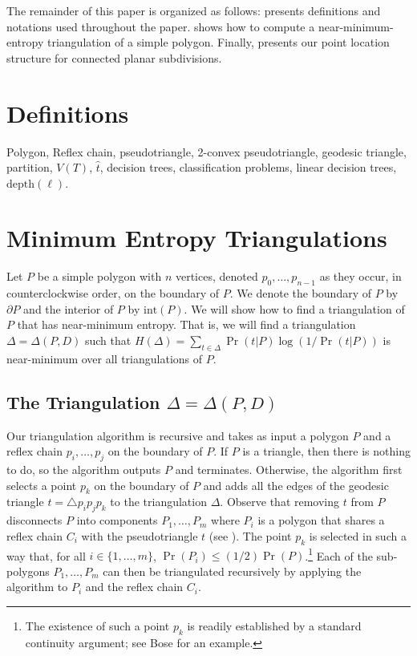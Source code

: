 \documentclass[lotsofwhite]{patmorin}
\newcommand{\boundary}{\partial}
\newcommand{\interior}{\mathrm{int}}
\newcommand{\z}[1]{{\hat{#1}}}
\newcommand{\depth}{\mathrm{depth}}
\begin{document}
The remainder of this paper is organized as follows:  
presents definitions and notations used throughout the paper.
 shows how to compute a near-minimum-entropy
triangulation of a simple polygon.  Finally, 
presents our point location structure for connected planar
subdivisions.

\section{Definitions}
Polygon, Reflex chain, pseudotriangle, 2-convex pseudotriangle,
geodesic triangle, partition, $V(T)$, $\z t$, decision trees,
classification problems, linear decision trees, $\depth(\ell)$.

\section{Minimum Entropy Triangulations} 

Let $P$ be a simple polygon with $n$ vertices, denoted
$p_0,\ldots,p_{n-1}$ as they occur, in counterclockwise order, on the
boundary of $P$.  We denote the boundary of $P$ by $\boundary P$ and
the interior of $P$ by $\interior(P)$.  We will show how to find a
triangulation of $P$ that has near-minimum entropy.  That is, we will
find a triangulation $\Delta=\Delta(P,D)$ such that $H(\Delta) =
\sum_{t\in\Delta} \Pr(t|P)\log(1/\Pr(t|P))$ is near-minimum over all
triangulations of $P$.  

\subsection{The Triangulation $\Delta=\Delta(P,D)$}

Our triangulation algorithm is recursive and takes as input a polygon
$P$ and a reflex chain $p_i,\ldots,p_j$ on the boundary of $P$.  If
$P$ is a triangle, then there is nothing to do, so the algorithm
outputs $P$ and terminates. Otherwise, the
algorithm first selects a point $p_k$ on the boundary of $P$ and adds
all the edges of the geodesic triangle $t=\triangle p_ip_jp_k$ to the
triangulation $\Delta$.
Observe that removing $t$ from $P$ disconnects $P$ into
components $P_1,\ldots,P_m$ where $P_i$ is a polygon that shares a
reflex chain $C_i$ with the pseudotriangle $t$ (see
).  The point
$p_k$ is selected in such a way that, for all $i\in\{1,\ldots,m\}$, $\Pr(P_i)
\le (1/2)\Pr(P)$.\footnote{The existence of such a point $p_k$ is
readily established by a standard continuity argument; see Bose \etal
\cite{bXX} for an example.} Each of the sub-polygons $P_1,\ldots,P_m$
can then be triangulated recursively by applying the algorithm to
$P_i$ and the reflex chain $C_i$.
\end{document}
